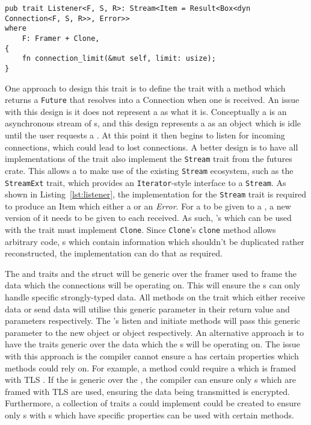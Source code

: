 \begin{lstlisting}[float=h, label=lst:listener, caption={The Listener trait, showing the Stream
implementation requirement for all implementers.}]
pub trait Listener<F, S, R>: Stream<Item = Result<Box<dyn Connection<F, S, R>>, Error>>
where
    F: Framer + Clone,
{
    fn connection_limit(&mut self, limit: usize);
}

\end{lstlisting}
One approach to design this trait is to define the trait with a method which returns a \texttt{Future} that resolves
into a Connection when one is received.
An issue with this design is it does not represent a \listener{} as what it is.
Conceptually a \listener{} is an asynchronous stream of \connection{}s, and this design represents a
\listener{} as an object which is idle until the user requests a \connection{}.
At this point it then begins to listen for incoming connections, which could lead to lost connections.
A better design is to have all implementations of the \listener{} trait also implement the \texttt{Stream} trait
from the futures crate.
This allows a \listener{} to make use of the existing \texttt{Stream} ecosystem, such as the \texttt{StreamExt}
trait, which provides an \texttt{Iterator}-style interface to a \texttt{Stream}.
As shown in Listing~\ref{lst:listener}, the implementation for the \texttt{Stream} trait is required to produce an Item
which either a \connection{} or an \emph{Error}.
For a \framer{} to be given to a \listener{}, a new version of it needs to be given to each \connection{}
received.
As such, \framer{}'s which can be used with the \listener{} trait must implement \texttt{Clone}.
Since \texttt{Clone}'s \texttt{clone} method allows arbitrary code, \framer{}s which contain information which
shouldn't be duplicated rather reconstructed, the implementation can do that as required.

The \connection{} and \listener{} traits and the \preconnection{} struct will be generic over the framer
used to frame the data which the connections will be operating on.
This will ensure the \connection{}s can only handle specific strongly-typed data.
All methods on the \connection{} trait which either receive data or send data will utilise this generic parameter in
their return value and parameters respectively.
The \preconnection{}'s listen and initiate methods will pass this generic parameter to the new \listener{}
object or \connection{} object respectively.
An alternative approach is to have the traits generic over the data which the \connection{}s will be operating on.
The issue with this approach is the compiler cannot ensure a \connection{} has certain properties which methods
could rely on.
For example, a method could require a \connection{} which is framed with TLS .
If the \connection{} is generic over the \framer{}, the compiler can ensure only \connection{}s which are
framed with TLS are used, ensuring the data being transmitted is encrypted.
Furthermore, a collection of traits a \framer{} could implement could be created to ensure only \connection{}s
with \framer{}s which have specific properties can be used with certain methods.

